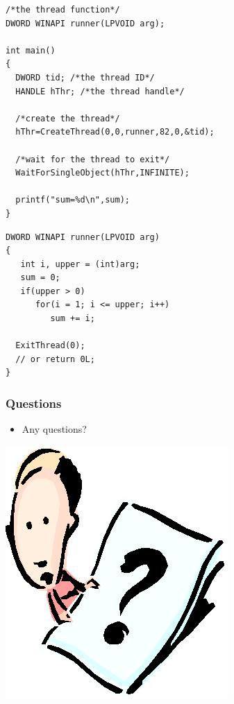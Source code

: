 \documentclass[CJKutf8,xcolor=pdftex,dvipsnames,table]{beamer}
\begin{document}
\begin{CJK*}{UTF8}{song}
\begin{frame}[fragile]
\begin{minipage}[c]{0.6\textwidth}
\begin{lstlisting}
/*the thread function*/
DWORD WINAPI runner(LPVOID arg);

int main()
{
  DWORD tid; /*the thread ID*/
  HANDLE hThr; /*the thread handle*/

  /*create the thread*/
  hThr=CreateThread(0,0,runner,82,0,&tid);

  /*wait for the thread to exit*/
  WaitForSingleObject(hThr,INFINITE);

  printf("sum=%d\n",sum);
}
\end{lstlisting}

  \end{minipage}%
  \begin{minipage}[c]{0.4\textwidth}
\lstset{frame=single}
\begin{lstlisting}
DWORD WINAPI runner(LPVOID arg)
{
   int i, upper = (int)arg;
   sum = 0;
   if(upper > 0)
      for(i = 1; i <= upper; i++)
         sum += i;

  ExitThread(0);
  // or return 0L;
}
\end{lstlisting}

  \end{minipage}
\end{frame}

  \begin{frame}
  \frametitle{Questions}
  \begin{itemize}
  \item{Any questions?}
  \end{itemize}
  \begin{center}
    \includegraphics[scale=.5]{question}
  \end{center}
  \end{frame}


\end{CJK*}
\end{document}
